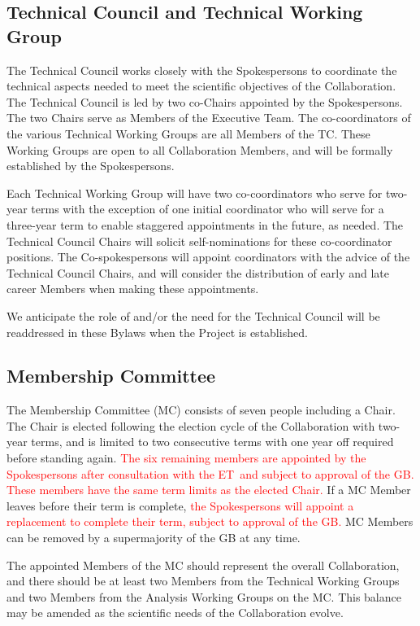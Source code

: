 \documentclass[12pt]{article}
\newcommand{\Comment}[1]{\textcolor{Blue}{(Comment: #1)}}
\newcommand{\exec}{{Executive Team}}
\newcommand{\shorte}{{ET}}  %
\begin{document}
\subsection{Technical Council and Technical Working Group}
The Technical Council works closely with the Spokespersons to coordinate the technical aspects needed to meet the scientific objectives of the Collaboration.  The Technical Council is led by two co-Chairs appointed by the Spokespersons.  The two Chairs serve as Members of the \exec.   The co-coordinators of the various Technical Working Groups are all Members of the TC.   These Working Groups are open to all Collaboration Members, and will be formally established by the Spokespersons.   

Each Technical Working Group will have two co-coordinators who serve for two-year terms with the exception of one initial coordinator who will serve for a three-year term to enable staggered appointments in the future, as needed.  The Technical Council Chairs will solicit self-nominations for these co-coordinator positions. The Co-spokespersons will appoint coordinators with the advice of the Technical Council Chairs, and will consider the distribution of early and late career Members when making these appointments.

We anticipate the role of and/or the need for the Technical Council will be readdressed in these Bylaws when the Project is established.

\subsection{Membership Committee}

The Membership Committee (MC) consists of seven people including a Chair. The Chair is elected following the election cycle of the Collaboration with  two-year terms, and is limited to two consecutive terms with one year off required before standing again. \textcolor{red}{The six remaining members are appointed by the Spokespersons after consultation with the \shorte\ and subject to approval of the GB.  These members have the same term limits as the elected Chair.} If a MC Member leaves before their term is complete,  \textcolor{red}{the Spokespersons will appoint a replacement to complete their term, subject to approval of the GB.}   MC Members can be removed by a supermajority of the GB at any time.  


The appointed Members of the MC should represent the overall Collaboration, and there should be at least two Members from the Technical Working Groups and two Members from the Analysis Working Groups on the MC.  This balance may be amended as the scientific needs of the Collaboration evolve. %
\end{document}
